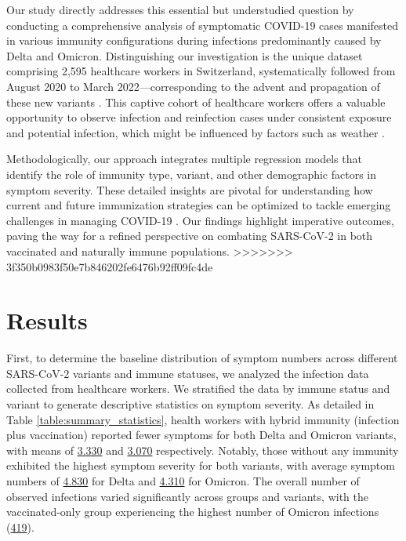 \documentclass[11pt]{article}
\begin{document}
Our study directly addresses this essential but understudied question by conducting a comprehensive analysis of symptomatic COVID-19 cases manifested in various immunity configurations during infections predominantly caused by Delta and Omicron. Distinguishing our investigation is the unique dataset comprising 2,595 healthcare workers in Switzerland, systematically followed from August 2020 to March 2022—corresponding to the advent and propagation of these new variants \cite{Lang2023InfluenzaVB, Piccoli2020RiskAA}. This captive cohort of healthcare workers offers a valuable opportunity to observe infection and reinfection cases under consistent exposure and potential infection, which might be influenced by factors such as weather \cite{Ganslmeier2021TheIO}.

Methodologically, our approach integrates multiple regression models that identify the role of immunity type, variant, and other demographic factors in symptom severity. These detailed insights are pivotal for understanding how current and future immunization strategies can be optimized to tackle emerging challenges in managing COVID-19 \cite{Chun2014ImpactOV, Tsanas2011NonlinearSA}. Our findings highlight imperative outcomes, paving the way for a refined perspective on combating SARS-CoV-2 in both vaccinated and naturally immune populations.
>>>>>>> 3f350b0983f50e7b846202fe6476b92ff09fc4de

\section*{Results}

First, to determine the baseline distribution of symptom numbers across different SARS-CoV-2 variants and immune statuses, we analyzed the infection data collected from healthcare workers. We stratified the data by immune status and variant to generate descriptive statistics on symptom severity. As detailed in Table \ref{table:summary_statistics}, health workers with hybrid immunity (infection plus vaccination) reported fewer symptoms for both Delta and Omicron variants, with means of \hyperlink{A0a}{3.330} and \hyperlink{A1a}{3.070} respectively. Notably, those without any immunity exhibited the highest symptom severity for both variants, with average symptom numbers of \hyperlink{A4a}{4.830} for Delta and \hyperlink{A5a}{4.310} for Omicron. The overall number of observed infections varied significantly across groups and variants, with the vaccinated-only group experiencing the highest number of Omicron infections (\hyperlink{A7c}{419}).
\end{document}
